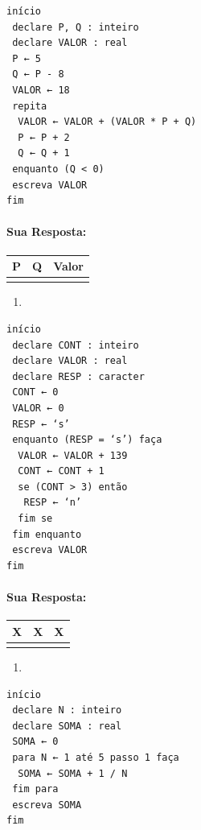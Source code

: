 \documentclass[12pt,a4paper]{article}
\providecommand{\tightlist}{%
      \setlength{\itemsep}{0pt}\setlength{\parskip}{0pt}}
\begin{document}
\begin{verbatim}
início
 declare P, Q : inteiro
 declare VALOR : real
 P ← 5
 Q ← P - 8
 VALOR ← 18
 repita
  VALOR ← VALOR + (VALOR * P + Q)
  P ← P + 2
  Q ← Q + 1
 enquanto (Q < 0)
 escreva VALOR
fim 
\end{verbatim}

    \hypertarget{sua-resposta}{%
\paragraph{Sua Resposta:}\label{sua-resposta}}

\begin{longtable}[]{@{}ccc@{}}
\toprule
P & Q & Valor\tabularnewline
\midrule
\endhead
& &\tabularnewline
\bottomrule
\end{longtable}

    \begin{enumerate}
\def\labelenumi{\alph{enumi})}
\setcounter{enumi}{5}
\tightlist
\item
\end{enumerate}

\begin{verbatim}
início
 declare CONT : inteiro
 declare VALOR : real
 declare RESP : caracter
 CONT ← 0
 VALOR ← 0
 RESP ← ‘s’
 enquanto (RESP = ‘s’) faça
  VALOR ← VALOR + 139
  CONT ← CONT + 1
  se (CONT > 3) então
   RESP ← ‘n’
  fim se
 fim enquanto
 escreva VALOR
fim
\end{verbatim}

    \hypertarget{sua-resposta}{%
\paragraph{Sua Resposta:}\label{sua-resposta}}

\begin{longtable}[]{@{}ccc@{}}
\toprule
X & X & X\tabularnewline
\midrule
\endhead
& &\tabularnewline
\bottomrule
\end{longtable}

    \begin{enumerate}
\def\labelenumi{\alph{enumi})}
\setcounter{enumi}{6}
\tightlist
\item
\end{enumerate}

\begin{verbatim}
início
 declare N : inteiro
 declare SOMA : real
 SOMA ← 0
 para N ← 1 até 5 passo 1 faça
  SOMA ← SOMA + 1 / N
 fim para
 escreva SOMA
fim 
\end{verbatim}
\end{document}
